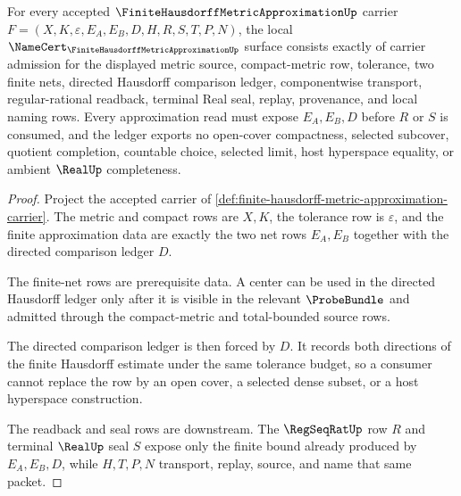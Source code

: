\begin{theorem}
\label{thm:finite-hausdorff-metric-approximation-namecert-obligations}
For every accepted $\FiniteHausdorffMetricApproximationUp$ carrier $F=(X,K,\varepsilon,E_A,E_B,D,H,R,S,T,P,N)$, the local $\NameCert_{\FiniteHausdorffMetricApproximationUp}$ surface consists exactly of carrier admission for the displayed metric source, compact-metric row, tolerance, two finite nets, directed Hausdorff comparison ledger, componentwise transport, regular-rational readback, terminal Real seal, replay, provenance, and local naming rows. Every approximation read must expose $E_A,E_B,D$ before $R$ or $S$ is consumed, and the ledger exports no open-cover compactness, selected subcover, quotient completion, countable choice, selected limit, host hyperspace equality, or ambient $\RealUp$ completeness.
\end{theorem}
\begin{proof}
Project the accepted carrier of \autoref{def:finite-hausdorff-metric-approximation-carrier}. The metric and compact rows are $X,K$, the tolerance row is $\varepsilon$, and the finite approximation data are exactly the two net rows $E_A,E_B$ together with the directed comparison ledger $D$.

The finite-net rows are prerequisite data. A center can be used in the directed Hausdorff ledger only after it is visible in the relevant $\ProbeBundle$ and admitted through the compact-metric and total-bounded source rows.

The directed comparison ledger is then forced by $D$. It records both directions of the finite Hausdorff estimate under the same tolerance budget, so a consumer cannot replace the row by an open cover, a selected dense subset, or a host hyperspace construction.

The readback and seal rows are downstream. The $\RegSeqRatUp$ row $R$ and terminal $\RealUp$ seal $S$ expose only the finite bound already produced by $E_A,E_B,D$, while $H,T,P,N$ transport, replay, source, and name that same packet.
\end{proof}


